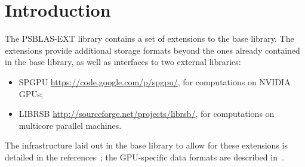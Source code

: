 \section{Introduction}\label{sec:intro}

The PSBLAS-EXT  library contains a set of extensions to the base
library. The extensions provide additional storage formats beyond the
 ones already contained in the base library, as well as interfaces to
 two external libraries:
\begin{itemize}
\item SPGPU \url{https://code.google.com/p/spgpu/}, for computations on
  NVIDIA GPUs;
\item LIBRSB \url{http://sourceforge.net/projects/librsb/}, for
  computations on multicore parallel machines. 
\end{itemize}
The infrastructure laid out in the base library to allow for these
extensions is detailed in the references~\cite{CaFiRo:2014,Sparse03};
the GPU-specific data formats are described in~\cite{OurTechRep}. 


